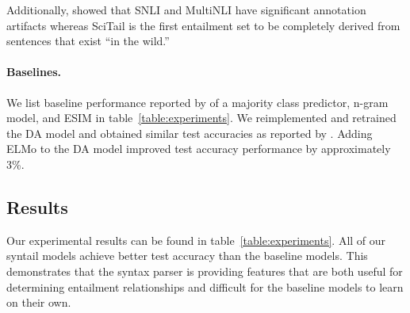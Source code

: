 \documentclass[11pt,a4paper]{article}
\begin{document}
Additionally, \citet{gururangan2018annotation} showed that SNLI and MultiNLI
have significant annotation artifacts whereas SciTail is the first entailment
set to be completely derived from sentences that exist ``in the wild.''

\paragraph{Baselines.}
We list baseline performance reported by \citet{Khot2018-th} of a majority
class predictor, n-gram model, and ESIM \citep{chen2016enhanced} in
table~\ref{table:experiments}. We reimplemented and retrained the DA model and
obtained similar test accuracies as reported by \citet{chen2016enhanced}.
Adding ELMo to the DA model improved test accuracy performance by approximately
3\%.

\subsection{Results}

\begin{table}[htb]
\centering
{}
\caption{Dev and test accuracies on SciTail.}
\label{table:experiments}
\end{table}

Our experimental results can be found in table~\ref{table:experiments}. All of
our syntail models achieve better test accuracy than the baseline models. This
demonstrates that the syntax parser is providing features that are both useful
for determining entailment relationships and difficult for the baseline models
to learn on their own.
\end{document}
